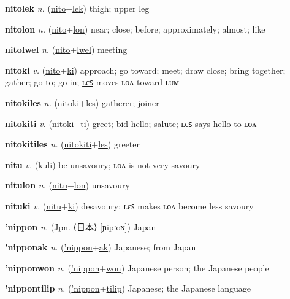 \textbf{\hypertarget{nitolek}{nitolek}} \textit{n.} (\hyperlink{nito}{nito}+\allowbreak \hyperlink{lek}{lek})
thigh; upper leg

\textbf{\hypertarget{nitolon}{nitolon}} \textit{n.} (\hyperlink{nito}{nito}+\allowbreak \hyperlink{lon}{lon})
near; close; before; approximately; almost; like

\textbf{\hypertarget{nitolwel}{nitolwel}} \textit{n.} (\hyperlink{nito}{nito}+\allowbreak \hyperlink{lwel}{lwel})
meeting

\textbf{\hypertarget{nitoki}{nitoki}} \textit{v.} (\hyperlink{nito}{nito}+\allowbreak \hyperlink{ki}{ki})
approach; go toward; meet; draw close; bring together; gather; go to; go in; \hyperlink{nitokiles}{ʟєꜱ} moves ʟᴏᴧ toward ʟᴜᴍ

\textbf{\hypertarget{nitokiles}{nitokiles}} \textit{n.} (\hyperlink{nitoki}{nitoki}+\allowbreak \hyperlink{les}{les})
gatherer; joiner

\textbf{\hypertarget{nitokiti}{nitokiti}} \textit{v.} (\hyperlink{nitoki}{nitoki}+\allowbreak \hyperlink{ti}{ti})
greet; bid hello; salute; \hyperlink{nitokitiles}{ʟєꜱ} says hello to ʟᴏᴧ

\textbf{\hypertarget{nitokitiles}{nitokitiles}} \textit{n.} (\hyperlink{nitokiti}{nitokiti}+\allowbreak \hyperlink{les}{les})
greeter

\textbf{\hypertarget{nitu}{nitu}} \textit{v.} (\hyperlink{kuli}{\sout{kuli}})
be unsavoury; \hyperlink{nitulon}{ʟᴏᴧ} is not very savoury

\textbf{\hypertarget{nitulon}{nitulon}} \textit{n.} (\hyperlink{nitu}{nitu}+\allowbreak \hyperlink{lon}{lon})
unsavoury

\textbf{\hypertarget{nituki}{nituki}} \textit{v.} (\hyperlink{nitu}{nitu}+\allowbreak \hyperlink{ki}{ki})
desavoury; ʟєꜱ makes ʟᴏᴧ become less savoury

\textbf{\hypertarget{'nippon}{'nippon}} \textit{n.} (Jpn. ⟨{\japanese{}日本}⟩ [ɲipːoɴ])
Japan

\textbf{\hypertarget{'nipponak}{'nipponak}} \textit{n.} (\hyperlink{'nippon}{'nippon}+\allowbreak \hyperlink{ak}{ak})
Japanese; from Japan

\textbf{\hypertarget{'nipponwon}{'nipponwon}} \textit{n.} (\hyperlink{'nippon}{'nippon}+\allowbreak \hyperlink{won}{won})
Japanese person; the Japanese people

\textbf{\hypertarget{'nippontilip}{'nippontilip}} \textit{n.} (\hyperlink{'nippon}{'nippon}+\allowbreak \hyperlink{tilip}{tilip})
Japanese; the Japanese language

